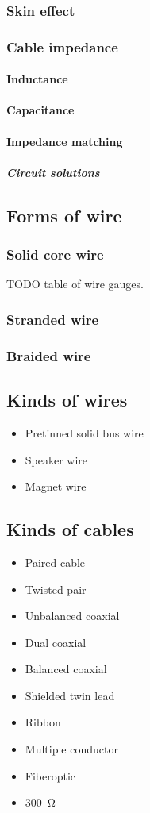 \documentclass{report}
\begin{document}
\subsubsection{Skin effect}
\subsubsection{Cable impedance}
\paragraph{Inductance}
\paragraph{Capacitance}
\paragraph{Impedance matching}
\subparagraph{Circuit solutions}
\subsection{Forms of wire}
\subsubsection{Solid core wire}
TODO table of wire gauges.
\subsubsection{Stranded wire}
\subsubsection{Braided wire}
\subsection{Kinds of wires}
\begin{itemize}
\item Pretinned solid bus wire
\item Speaker wire
\item Magnet wire
\end{itemize}
\subsection{Kinds of cables}
\begin{itemize}
\item Paired cable
\item Twisted pair
\item Unbalanced coaxial
\item Dual coaxial
\item Balanced coaxial
\item Shielded twin lead
\item Ribbon
\item Multiple conductor
\item Fiberoptic
\item \SI{300}{\ohm}
\end{itemize}
\end{document}
